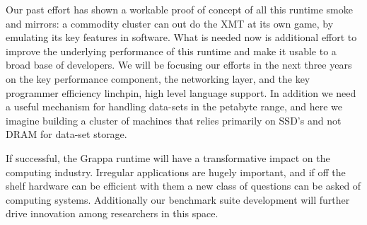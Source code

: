 Our past effort has shown a workable proof of concept of all this runtime smoke and mirrors: a commodity cluster can out do the XMT at its own game, by emulating its key features in software.  What is needed now is additional effort to improve the underlying performance of this runtime and make it usable to a broad base of developers.  We will be focusing our efforts in the next three years on the key performance component, the networking layer, and the key programmer efficiency linchpin, high level language support.  In addition we need a useful mechanism for handling data-sets in the petabyte range, and here we imagine building a cluster of machines that relies primarily on SSD's and not DRAM for data-set storage.

If successful, the Grappa runtime will have a transformative impact on the computing industry.  Irregular applications are hugely important, and if off the shelf hardware can be efficient with them a new class of questions can be asked of computing systems.  Additionally our benchmark suite development will further drive innovation among researchers in this space.




